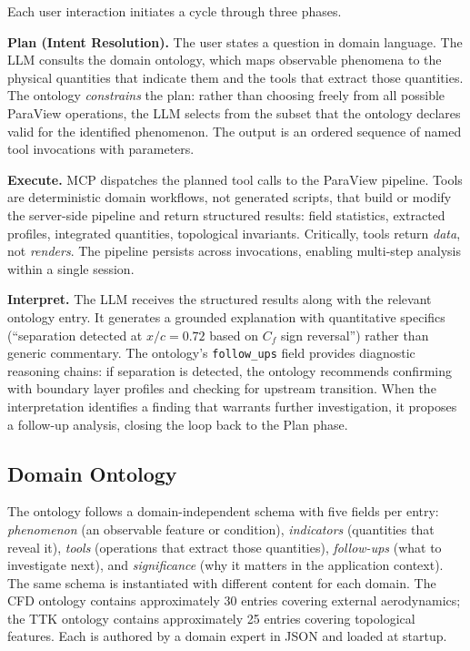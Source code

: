 \documentclass{vgtc}                          %
\begin{document}
Each user interaction initiates a cycle through three phases.

\textbf{Plan (Intent Resolution).}
The user states a question in domain language.
The LLM consults the domain ontology, which maps observable phenomena to the
physical quantities that indicate them and the tools that extract those
quantities.
The ontology \textit{constrains} the plan: rather than choosing freely from
all possible ParaView operations, the LLM selects from the subset that the
ontology declares valid for the identified phenomenon.
The output is an ordered sequence of named tool invocations with parameters.

\textbf{Execute.}
MCP dispatches the planned tool calls to the ParaView pipeline.
Tools are deterministic domain workflows, not generated scripts, that build
or modify the server-side pipeline and return structured results: field
statistics, extracted profiles, integrated quantities, topological invariants.
Critically, tools return \textit{data}, not \textit{renders}.
The pipeline persists across invocations, enabling multi-step analysis within
a single session.

\textbf{Interpret.}
The LLM receives the structured results along with the relevant ontology entry.
It generates a grounded explanation with quantitative specifics (``separation
detected at $x/c = 0.72$ based on $C_f$ sign reversal'') rather than generic
commentary.
The ontology's \texttt{follow\_ups} field provides diagnostic reasoning chains:
if separation is detected, the ontology recommends confirming with boundary
layer profiles and checking for upstream transition.
When the interpretation identifies a finding that warrants further investigation,
it proposes a follow-up analysis, closing the loop back to the Plan phase.

\subsection{Domain Ontology}

The ontology follows a domain-independent schema with five fields per entry:
\textit{phenomenon} (an observable feature or condition),
\textit{indicators} (quantities that reveal it),
\textit{tools} (operations that extract those quantities),
\textit{follow-ups} (what to investigate next),
and \textit{significance} (why it matters in the application context).
The same schema is instantiated with different content for each domain.
The CFD ontology contains approximately 30 entries covering external aerodynamics;
the TTK ontology contains approximately 25 entries covering topological features.
Each is authored by a domain expert in JSON and loaded at startup.
\end{document}
